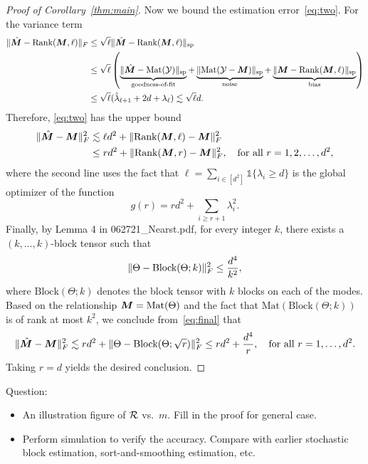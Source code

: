 \documentclass[10pt]{article}
\newcommand*{\KeepStyleUnderBrace}[1]{%
  \mathop{%
    \mathchoice
    {\underbrace{\displaystyle#1}}%
    {\underbrace{\textstyle#1}}%
    {\underbrace{\scriptstyle#1}}%
    {\underbrace{\scriptscriptstyle#1}}%
  }\limits
}
\theoremstyle{definition}
\theoremstyle{definition}
\def\rank{\text{Rank}}
\def\Mat{\text{Mat}}
\theoremstyle{definition}
\begin{document}
\begin{proof}[Proof of Corollary~\ref{thm:main}]
Now we bound the estimation error~\eqref{eq:two}. For the variance term
\begin{align}
\FnormSize{}{\hat \mM-\rank(\mM, \ell)} &\leq \sqrt{\ell}\snormSize{}{\hat \mM-\rank(\mM, \ell)}\\
&\leq \sqrt{\ell}\left(\KeepStyleUnderBrace{\snormSize{}{\hat \mM-\Mat(\tY)}}_{\text{goodness-of-fit}}+\KeepStyleUnderBrace{\snormSize{}{\Mat(\tY-\mM)}}_{\text{noise}}+\KeepStyleUnderBrace{\snormSize{}{\mM-\rank(\mM,\ell)}}_{\text{bias}}\right)\\
&\leq\sqrt{\ell}(\hat \lambda_{\ell+1}+2d+\lambda_\ell)\lesssim  \sqrt{\ell} d.
\end{align}
Therefore, \eqref{eq:two} has the upper bound
\begin{align}\label{eq:final}
\FnormSize{}{\hat \mM-\mM}^2 &\lesssim \ell d^2+\FnormSize{}{\rank(\mM,\ell)-\mM}^2 \notag \\
&\leq rd^2+\FnormSize{}{\rank(\mM,r)-\mM}^2, \quad \text{for all }r=1,2,\ldots,d^2,
\end{align}
where the second line uses the fact that $\ell=\sum_{i\in[d^2]}\mathds{1}\{\lambda_i\geq d\}$ is the global optimizer of the function
\[
g(r)=rd^2+\sum_{i\geq r+1}\lambda^2_i.
\]
Finally, by Lemma 4 in 062721\_Nearst.pdf, for every integer $k$, there exists a $(k,\ldots,k)$-block tensor such that
\[
\lVert\Theta-\text{Block}(\Theta;k)\rVert_F^2\leq {d^4\over k^2}, 
\]
where $\text{Block}(\Theta;k)$ denotes the block tensor with $k$ blocks on each of the modes. Based on the relationship $\mM=\Mat(\Theta)$ and the fact that $\Mat(\text{Block}(\Theta; k))$ is of rank at most $k^2$, we conclude from~\eqref{eq:final} that
\[
\lVert\hat {\bm M}-\bm M\rVert_F^2  \lesssim rd^2+\lVert\Theta-\text{Block}(\Theta;\sqrt{r})\rVert_F^2 \leq rd^2 +{d^4\over r}, \quad \text{for all }r=1,\ldots,d^2. 
\]
Taking $r=d$ yields the desired conclusion. 
\end{proof}


Question: 
\begin{itemize}
\item An illustration figure of $\mathcal{R}$ vs.\ $m$. Fill in the proof for general case. 
\item Perform simulation to verify the accuracy. Compare with earlier stochastic block estimation, sort-and-smoothing estimation, etc.  
\end{itemize}


\end{document}
